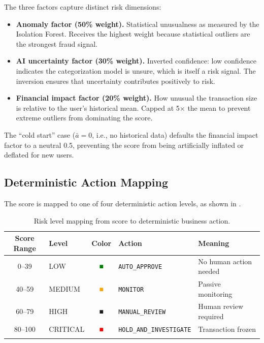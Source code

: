\documentclass[11pt,a4paper]{article}
\begin{document}
The three factors capture distinct risk dimensions:

\begin{itemize}[leftmargin=*]
  \item \textbf{Anomaly factor (50\% weight).} Statistical unusualness as measured by the Isolation Forest. Receives the highest weight because statistical outliers are the strongest fraud signal.
  \item \textbf{AI uncertainty factor (30\% weight).} Inverted confidence: low confidence indicates the categorization model is unsure, which is itself a risk signal. The inversion ensures that uncertainty contributes positively to risk.
  \item \textbf{Financial impact factor (20\% weight).} How unusual the transaction size is relative to the user's historical mean. Capped at 5$\times$ the mean to prevent extreme outliers from dominating the score.
\end{itemize}

The ``cold start'' case ($\bar{a} = 0$, i.e., no historical data) defaults the financial impact factor to a neutral 0.5, preventing the score from being artificially inflated or deflated for new users.

\subsection{Deterministic Action Mapping}
\label{subsec:action-mapping}

The score is mapped to one of four deterministic action levels, as shown in .

\begin{table}[ht]
  \centering
  \begin{tabular}{clclp{5cm}}
  \toprule
  \textbf{Score Range} & \textbf{Level} & \textbf{Color} & \textbf{Action} & \textbf{Meaning} \\
  \midrule
  0--39 & LOW & \textcolor{green}{\textbf{■}} & \texttt{AUTO\_APPROVE} & No human action needed \\
  40--59 & MEDIUM & \textcolor{orange}{\textbf{■}} & \texttt{MONITOR} & Passive monitoring \\
  60--79 & HIGH & \textcolor{orange!80!black}{\textbf{■}} & \texttt{MANUAL\_REVIEW} & Human review required \\
  80--100 & CRITICAL & \textcolor{red}{\textbf{■}} & \texttt{HOLD\_AND\_INVESTIGATE} & Transaction frozen \\
  \bottomrule
  \caption{Risk level mapping from score to deterministic business action.}
  \label{tab:risk-levels}
  \end{tabular}
\end{table}
\end{document}
